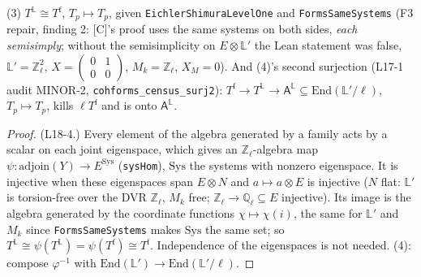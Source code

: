 \begin{proposition}\label{prop:cohforms-3}
  \leanok
  (3) $T^{\mathbb L}\cong T^{\mathrm f}$, $T_p\mapsto T_p$, given \texttt{EichlerShimuraLevelOne} and \texttt{FormsSameSystems}
  (F3 repair, finding 2: [C]'s proof uses the same systems on both sides, \emph{each semisimply}; without the semisimplicity
  on $E\otimes\mathbb L'$ the Lean statement was false, $\mathbb L'=\mathbb Z_\ell^2$, $X=\left(\begin{smallmatrix}0&1\\0&0\end{smallmatrix}\right)$,
  $M_k=\mathbb Z_\ell$, $X_M=0$). And (4)'s second surjection (L17-1 audit MINOR-2, \texttt{cohforms\_census\_surj2}):
  $T^{\mathrm f}\to T^{\mathbb L}\to\mathsf A^{\mathbb L}\subseteq\mathrm{End}(\mathbb L'/\ell)$, $T_p\mapsto T_p$, kills $\ell T^{\mathrm f}$ and
  is onto $\mathsf A^{\mathbb L}$.
\end{proposition}
\begin{proof}
  \leanok
  (L18-4.) Every element of the algebra generated by a family acts by a scalar on each joint eigenspace, which gives an
  $\mathbb Z_\ell$-algebra map $\psi\colon\mathrm{adjoin}(Y)\to E^{\mathrm{Sys}}$ (\texttt{sysHom}), $\mathrm{Sys}$ the systems with nonzero
  eigenspace. It is injective when these eigenspaces span $E\otimes N$ and $a\mapsto a\otimes E$ is injective ($N$ flat:
  $\mathbb L'$ is torsion-free over the DVR $\mathbb Z_\ell$, $M_k$ free; $\mathbb Z_\ell\to\mathbb Q_\ell\subseteq E$ injective).
  Its image is the algebra generated by the coordinate functions $\chi\mapsto\chi(i)$, the same for $\mathbb L'$ and $M_k$ since
  \texttt{FormsSameSystems} makes $\mathrm{Sys}$ the same set; so $T^{\mathbb L}\cong\psi(T^{\mathbb L})=\psi(T^{\mathrm f})\cong T^{\mathrm f}$.
  Independence of the eigenspaces is not needed. (4): compose $\varphi^{-1}$ with $\mathrm{End}(\mathbb L')\to\mathrm{End}(\mathbb L'/\ell)$.
\end{proof}

